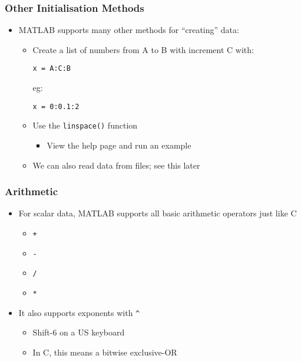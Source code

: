\documentclass[14pt]{beamer}
\begin{document}
\begin{frame}[fragile]
\frametitle{Other Initialisation Methods}
\begin{itemize}
\item MATLAB supports many other methods for ``creating'' data:
	\begin{itemize}
		\item Create a list of numbers from A to B with increment C with:
\begin{lstlisting}[style=pseudo]
x = A:C:B
\end{lstlisting}
eg:
\begin{lstlisting}[style=pseudo]
x = 0:0.1:2
\end{lstlisting}
\item Use the \texttt{linspace()} function
	\begin{itemize}
		\item View the help page and run an example
	\end{itemize}
	\item We can also read data from files; see this later
	\end{itemize}
\end{itemize}
\end{frame}

\begin{frame}
\frametitle{Arithmetic}
\begin{itemize}
\item For scalar data, MATLAB supports all basic arithmetic operators just like C
	\begin{itemize}
		\item \texttt{+}
		\item \texttt{-}
		\item \texttt{/}
		\item \texttt{*}
	\end{itemize}
\item It also supports exponents with \texttt{\^}
	\begin{itemize}
		\item Shift-6 on a US keyboard
		\item In C, this means a bitwise exclusive-OR
	\end{itemize}
\end{itemize}
\end{frame}
\end{document}
